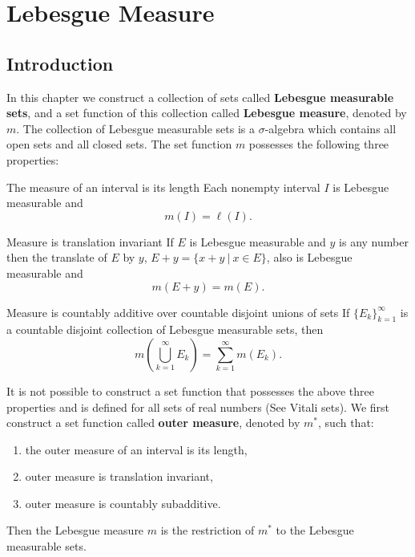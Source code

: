 \chapter{Lebesgue Measure}

\section{Introduction}
In this chapter we construct a collection of sets called \textbf{Lebesgue measurable sets}, and a set function of this collection called \textbf{Lebesgue measure}, denoted by $m$. The collection of Lebesgue measurable sets is a $\sigma$-algebra which contains all open sets and all closed sets. The set function $m$ possesses the following three properties:
\begin{namedthm*}{The measure of an interval is its length}
Each nonempty interval $I$ is Lebesgue measurable and 
\[
m(I) = \ell(I).
\]
\end{namedthm*}
\begin{namedthm*}{Measure is translation invariant}
If $E$ is Lebesgue measurable and $y$ is any number then the translate of $E$ by $y$, $E+y = \{x+y \ |\ x \in E\}$, also is Lebesgue measurable and
\[
m(E+y) = m(E).
\]
\end{namedthm*}
\begin{namedthm*}{Measure is countably additive over countable disjoint unions of sets}
If $\{E_k\}_{k=1}^\infty$ is a countable disjoint collection of Lebesgue measurable sets, then
\[
m(\bigcup_{k=1}^\infty E_k) = \sum_{k=1}^\infty m(E_k).
\]
\end{namedthm*}
It is not possible to construct a set function that possesses the above three properties and is defined for all sets of real numbers (See Vitali sets).
We first construct a set function called \textbf{outer measure}, denoted by $m^*$, such that: 
\begin{enumerate}[label=(\roman*),align=left]
	\item the outer measure of an interval is its length,
	\item outer measure is translation invariant,
	\item outer measure is countably subadditive.
\end{enumerate}
Then the Lebesgue measure $m$ is the restriction of $m^*$ to the Lebesgue measurable sets.

